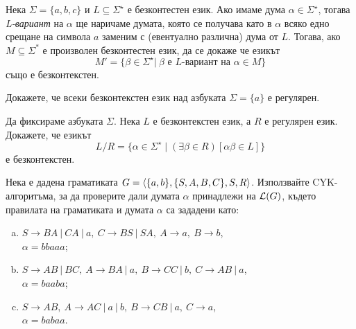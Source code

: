 \begin{problem}
  Нека $\Sigma = \{a,b,c\}$ и $L \subseteq \Sigma^\star$ е безконтестен език. Ако имаме дума 
  $\alpha \in \Sigma^\star$, тогава \emph{L-вариант} на $\alpha$ ще наричаме думата, която се получава като в $\alpha$ всяко едно 
  срещане на символа $a$ заменим с (евентуално различна) дума от $L$.
  Тогава, ако $M \subseteq \Sigma^*$ е произволен безконтестен език, да се докаже че езикът
  \begin{equation*}
    M' = \{\beta\in\Sigma^\star |\ \beta \text{ е $L$-вариант на } \alpha \in M \}
  \end{equation*}
  също е безконтекстен.
\end{problem}

\begin{problem}
  Докажете, че всеки безконтекстен език над азбуката $\Sigma = \{a\}$
  е регулярен.
\end{problem}
\ifhints
\begin{hint}
  
\end{hint}
\fi

\begin{problem}
  Да фиксираме азбуката $\Sigma$.
  Нека $L$ е безконтекстен език, а $R$ е регулярен език.
  Докажете, че езикът
  \[L/R = \{\alpha \in \Sigma^\star \mid (\exists \beta \in R)[\alpha \beta \in L]\}\]
  е безконтекстен.
\end{problem}
\ifhints
\begin{hint}
  
\end{hint}
\fi

\begin{problem}
  Нека е дадена граматиката $G = \langle{\{a,b\}, \{S,A,B,C\},S,R}\rangle$.
  Използвайте CYK-алгоритъма, за да проверите дали
  думата $\alpha$ принадлежи на $\mathcal{L}(G)$, където правилата на граматиката и думата $\alpha$
  са зададени като:
  \begin{enumerate}[a)]
  \item
    $S \to BA\ |\ CA\ |\ a,\ C\to BS\ |\ SA,\ A\to a,\ B\to b$,\\
    $\alpha=bbaaa$;
  \item
    $S \to AB\ |\ BC,\ A\to BA\ |\ a,\ B\to CC\ |\ b,\ C\to AB\ |\ a$,\\
    $\alpha=baaba$;
  \item
    $S \to AB,\ A\to AC\ |\ a\ |\ b,\ B\to CB\ |\ a,\ C\to a$,\\
    $\alpha=babaa$.
  \end{enumerate}
\end{problem}

